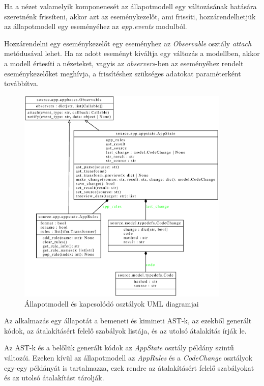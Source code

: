 Ha a nézet valamelyik komponenesét az állapotmodell egy változásának hatására szeretnénk frissíteni,
akkor azt az eseménykezelőt, ami frissíti,
hozzárendelhetjük az állapotmodell egy eseményéhez az \emph{app.events} modulból.

Hozzárendelni egy eseménykezelőt egy eseményhez az \emph{Observable} osztály
\emph{attach} metódusával lehet.
Ha az adott eseményt kiváltja egy változás a modellben, akkor a modell értesíti a
nézeteket,
vagyis az \emph{observers}-ben az eseményéhez rendelt eseménykezelőket meghívja,
a frissítéshez szükséges adatokat paraméterként továbbítva.

\begin{figure}[H]
	\centering
	\includegraphics[width=0.9\textwidth]{images/uml/appstate.eps}
	\caption{Állapotmodell és kapcsolódó osztályok UML diagramjai}
\end{figure}

Az alkalmazás egy állapotát a bemeneti és kimineti AST-k, az ezekből generált kódok,
az átalakításért felelő szabályok listája, és az utolsó átalakítás írják le.

Az AST-k és a belőlük generált kódok az \emph{AppState} osztály példány szintű változói.
Ezeken kívül az állapotmodell az \emph{AppRules} és a \emph{CodeChange} osztályok egy-egy
példányát
is tartalmazza, ezek rendre az átalakításért felelő szabályokat és az utolsó átalakítást
tárolják.

